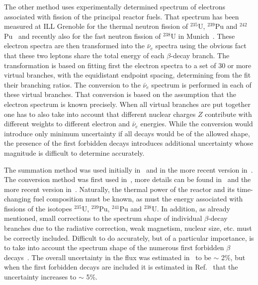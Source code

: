 \documentclass[aps,twocolumn,preprintnumbers,amsmath,superscriptaddress,amssymb,floats,nofootinbib]{revtex4-1}
\begin{document}
 The other method uses experimentally determined spectrum of electrons associated with fission of the principal reactor fuels. That spectrum has been 
 measured at ILL Grenoble for the thermal neutron fission of $^{235}$U, $^{239}$Pu and $^{242}$Pu~\cite{vonFeilitzsch,Schreckenbach,Hahn} and recently also for the fast neutron fission of $^{238}$U
 in Munich~\cite{Haag}. These electron spectra are then transformed into the $\bar{\nu}_e$ spectra using the obvious fact that these two leptons share the total energy
 of each $\beta$-decay branch. The transformation is based on fitting first the electron spectra to a set of 30 or more virtual branches, with the equidistant
 endpoint spacing, determining from the fit their branching ratios. 
 The conversion to the $\bar{\nu}_e$ spectrum is performed in each of these virtual branches. That conversion is based on the assumption 
 that the electron spectrum is known precisely.
 When all virtual branches are put together one has to also take into account that different nuclear charges $Z$ 
 contribute with different weights to different electron
 and $\bar{\nu}_e$ energies.
 While the conversion would introduce only minimum uncertainty if all decays would be of the allowed shape, the presence
 of the first forbidden decays introduces additional uncertainty whose magnitude is difficult to determine accurately.

The summation method was used
initially in~\cite{Davis,Vogel81,Klapdor-Pu,Klapdor-U,Kopeikin} and in the more recent version in~\cite{Mueller}. 
The conversion method was first used in~\cite{vonFeilitzsch,Schreckenbach,Hahn}, more details can be found in~\cite{Vogel07} and the more recent version in~\cite{Huber}.
Naturally, the thermal power of the reactor and its time-changing fuel composition must be known, as must the 
energy associated with fissions of the isotopes $^{235}$U, $^{239}$Pu, $^{241}$Pu
and $^{238}$U. In addition, as already mentioned, small corrections to the spectrum shape of individual $\beta$-decay branches due to the radiative correction, weak magnetism,
nuclear size,
etc. must be correctly included. Difficult to do accurately, but of a particular importance, is to take into account the spectrum shape of the numerous
first forbidden $\beta$ decays~\cite{Hayes}. The overall uncertainty in the flux was estimated in~\cite{Mueller, Huber} to be $\sim$ 2\%, but when the
first forbidden decays are included it is estimated in Ref.~\cite{Hayes} that the uncertainty increases to $\sim$ 5\%.
\end{document}
